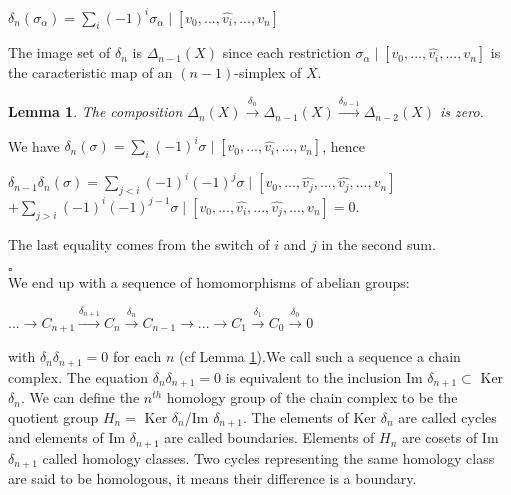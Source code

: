 \documentclass[12pt, a4paper]{article}
\newtheorem{lemma}{Lemma}
\newenvironment{proof}{{\sc Proof:}}{\hfill $\square$}
\begin{document}
\begin{center}

  $\delta_n(\sigma_\alpha) = \sum_i (-1)^i \sigma_\alpha \mid [v_0 , ... , \hat{v_i} , ... , v_n]$

\end{center}

The image set of $\delta_n$ is $\Delta_{n-1} (X)$ since each restriction $\sigma_\alpha \mid [v_0 , ... , \hat{v_i} , ... , v_n]$ is the caracteristic map of an $(n-1)$-simplex of $X$.\\

\begin{lemma}

  The composition $\Delta_n (X) \xrightarrow{\delta_n} \Delta_{n-1} (X) \xrightarrow{\delta_{n-1}} \Delta_{n-2} (X)$ is zero.

  \label{lemma:delta_comp}
\end{lemma}

\begin{proof}

  We have $\delta_n(\sigma) = \sum_i (-1)^i \sigma \mid [v_0, ... , \hat{v_i} , ... , v_n] $, hence \\
  \vspace{-10pt}
  \begin{center}
  $\delta_{n-1}\delta_n (\sigma) = \sum\limits_{j < i} (-1)^i (-1)^j \sigma \mid [v_0, ... , \hat{v_j} , ... , \hat{v_j} , ... , v_n]$
  \sv
$+ \sum\limits_{j > i} (-1)^i (-1)^{j-1} \sigma \mid [v_0, ... , \hat{v_i}, ... , \hat{v_j} , ... , v_n] = 0$.
\end{center}

  The last equality comes from the switch of $i$ and $j$ in the second sum.

\end{proof}
\\

We end up with a sequence of homomorphisms of abelian groups:

\begin{center}
  $... \to C_{n+1} \xrightarrow{\delta_{n+1}} C_n \xrightarrow{\delta_n} C_{n-1} \to ... \to C_1 \xrightarrow{\delta_1} C_0 \xrightarrow{\delta_0} 0$
\end{center}

with $\delta_n\delta_{n+1} = 0$ for each $n$ (cf Lemma \ref{lemma:delta_comp}).We call such a sequence a chain complex. The equation $\delta_n \delta_{n+1} = 0$ is equivalent to the inclusion Im $\delta_{n+1} \subset$ Ker $\delta_n$. We can define the $n^{th}$ homology group of the chain complex to be the quotient group $H_n =$ Ker $\delta_n$/Im $\delta_{n+1}$. The elements of Ker $\delta_n$ are called cycles and elements of Im $\delta_{n+1}$ are called boundaries. Elements of $H_n$ are cosets of Im $\delta_{n+1}$ called homology classes. Two cycles representing the same homology class are said to be homologous, it means their difference is a boundary.\\
\end{document}
